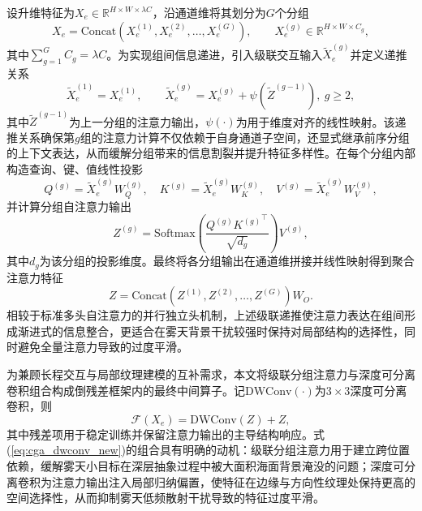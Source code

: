 设升维特征为$X_e \in \mathbb{R}^{H \times W \times \lambda C}$，沿通道维将其划分为$G$个分组
\begin{equation}
X_e = \mathrm{Concat}\!\left(X_e^{(1)}, X_e^{(2)}, \ldots, X_e^{(G)}\right), \qquad X_e^{(g)} \in \mathbb{R}^{H \times W \times C_g},
\label{eq:cga_split_new}
\end{equation}
其中$\sum_{g=1}^{G}C_g=\lambda C$。为实现组间信息递进，引入级联交互输入$\tilde{X}_e^{(g)}$并定义递推关系
\begin{equation}
\tilde{X}_e^{(1)} = X_e^{(1)}, \qquad
\tilde{X}_e^{(g)} = X_e^{(g)} + \psi\!\left(\tilde{Z}^{(g-1)}\right), \ g \ge 2,
\label{eq:cga_cascade_in_new}
\end{equation}
其中$\tilde{Z}^{(g-1)}$为上一分组的注意力输出，$\psi(\cdot)$为用于维度对齐的线性映射。该递推关系确保第$g$组的注意力计算不仅依赖于自身通道子空间，还显式继承前序分组的上下文表达，从而缓解分组带来的信息割裂并提升特征多样性。在每个分组内部构造查询、键、值线性投影
\begin{equation}
Q^{(g)} = \tilde{X}_e^{(g)}W_Q^{(g)}, \quad
K^{(g)} = \tilde{X}_e^{(g)}W_K^{(g)}, \quad
V^{(g)} = \tilde{X}_e^{(g)}W_V^{(g)},
\label{eq:cga_qkv_new}
\end{equation}
并计算分组自注意力输出
\begin{equation}
Z^{(g)} = \mathrm{Softmax}\!\left(\frac{Q^{(g)}{K^{(g)}}^{\top}}{\sqrt{d_g}}\right)V^{(g)},
\label{eq:cga_attn_new}
\end{equation}
其中$d_g$为该分组的投影维度。最终将各分组输出在通道维拼接并线性映射得到聚合注意力特征
\begin{equation}
Z = \mathrm{Concat}\!\left(Z^{(1)},Z^{(2)},\ldots,Z^{(G)}\right)W_O.
\label{eq:cga_concat_new}
\end{equation}
相较于标准多头自注意力的并行独立头机制，上述级联递推使注意力表达在组间形成渐进式的信息整合，更适合在雾天背景干扰较强时保持对局部结构的选择性，同时避免全量注意力导致的过度平滑。

为兼顾长程交互与局部纹理建模的互补需求，本文将级联分组注意力与深度可分离卷积组合构成倒残差框架内的最终中间算子。记$\mathrm{DWConv}(\cdot)$为$3\times 3$深度可分离卷积，则
\begin{equation}
\mathcal{F}(X_e) = \mathrm{DWConv}(Z) + Z,
\label{eq:cga_dwconv_new}
\end{equation}
其中残差项用于稳定训练并保留注意力输出的主导结构响应。式(\ref{eq:cga_dwconv_new})的组合具有明确的动机：级联分组注意力用于建立跨位置依赖，缓解雾天小目标在深层抽象过程中被大面积海面背景淹没的问题；深度可分离卷积为注意力输出注入局部归纳偏置，使特征在边缘与方向性纹理处保持更高的空间选择性，从而抑制雾天低频散射干扰导致的特征过度平滑。

